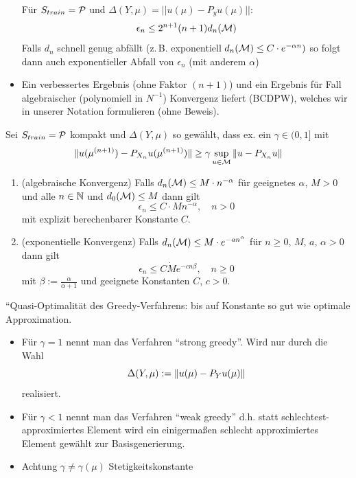 \begin{bem}
\begin{itemize}
		Für $S_{train} = \mathcal{P}$ und $\Delta(Y,\mu) = ||u(\mu) - P_yu(\mu)||$:
		\[
			\epsilon_n \leq 2^{n+1}(n+1) d_n(\mathcal{M})
		\]
		Falls $d_n$ schnell genug abfällt (z.\,B. exponentiell $d_n(\mathcal{M}) \leq C \cdot e^{-\alpha n})$ so folgt dann auch exponentieller Abfall von $\epsilon_n$ (mit anderem $\alpha$)
		\item Ein verbessertes Ergebnis (ohne Faktor $(n+1)$) und ein Ergebnis für Fall algebraischer (polynomiell in $N^{-1}$) Konvergenz liefert (BCDPW), welches wir in unserer Notation formulieren (ohne Beweis).
	\end{itemize}
\end{bem}

\begin{satz}
	Sei $S_{train} = \mathcal{P}$ kompakt und $\Delta(Y,\mu)$ so gewählt, dass ex. ein $\gamma \in (0,1]$ mit
	\begin{equation} \label{eq:3.24}
		\|u(\mu^{(n+1)}) - P_{X_n} u(\mu^{(n+1)})\| \geq \gamma \sup_{u \in \mathcal{M}} \|u-P_{X_n} u\|
	\end{equation}
	\begin{enumerate}
		\item (algebraische Konvergenz) Falls $d_n(\mathcal{M}) \leq M \cdot n^{-\alpha}$ für geeignetes $\alpha$, $M > 0$ und alle $n \in \mathbb{N}$ und $d_0(\mathcal{M}) \leq M$ dann gilt
			\[
				\epsilon_n \leq C \cdot M n^{-\alpha}, \quad n > 0
			\]
			mit explizit berechenbarer Konstante $C$.
		\item (exponentielle Konvergenz) Falls $d_n(\mathcal{M}) \leq M \cdot e^{-an^\alpha}$ für $n \geq 0$, $M$, $a$, $\alpha > 0$ dann gilt
			\[
				\epsilon_n \leq C \dot M e^{-cn\beta}, \quad n \geq 0
			\]
			mit $\beta := \frac{\alpha}{\alpha+1}$ und geeignete Konstanten $C$, $c > 0$.
	\end{enumerate}
\end{satz}

\begin{bem}
	``Quasi-Optimalität des Greedy-Verfahrens: bis auf Konstante so gut wie optimale Approximation.
\end{bem}

\begin{bem} \beginwithlistbem
	\begin{itemize}
		\item Für $\gamma = 1$ nennt man das Verfahren ``strong greedy''.
			Wird nur durch die Wahl
			\[
				\Delta(Y,\mu) := \|u(\mu)-P_Y u(\mu)\|
			\]
			realisiert.
		\item Für $\gamma < 1$ nennt man das Verfahren ``weak greedy'' d.h. statt schlechtest-approximiertes Element wird ein einigermaßen schlecht approximiertes Element gewählt zur Basisgenerierung.
		\item Achtung $\gamma \neq \gamma(\mu)$ Stetigkeitskonstante
	\end{itemize}
\end{bem}

